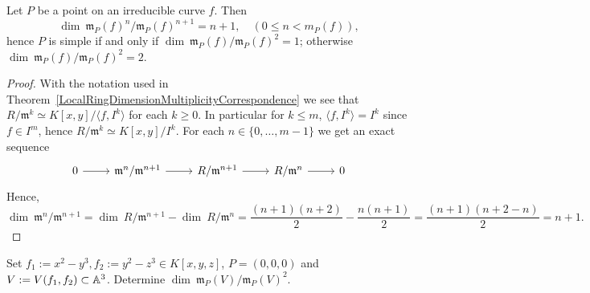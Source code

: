     \begin{proposition}
        Let $P$ be a point on an irreducible curve $f$. Then 
        $$\dim\ \mathfrak{m}_P(f)^n/\mathfrak{m}_P(f)^{n+1} = n+1, \quad (0\leq n < m_P(f)),$$
        hence $P$ is simple if and only if $\dim\ \mathfrak{m}_P(f)/\mathfrak{m}_P(f)^2= 1$; otherwise $\dim\ \mathfrak{m}_P(f)/\mathfrak{m}_P(f)^2= 2$.
    \end{proposition}
    \begin{proof}
        With the notation used in Theorem~\ref{LocalRingDimensionMultiplicityCorrespondence} we see that $R/\mathfrak{m}^k \simeq K[x,y]/\langle f,I^k\rangle$ for each $k\geq 0$. In particular for $k\leq m$, $\langle f, I^k\rangle = I^k$ since $f\in I^m$, hence $R/\mathfrak{m}^k \simeq K[x,y]/I^k$. For each $n\in\{0,\dots,m-1\}$ we get an exact sequence 
        $$\begin{tikzcd}
            0\arrow[r] & \mathfrak{m}^n/\mathfrak{m}^{n+1} \arrow[r] &R/\mathfrak{m}^{n+1} \arrow[r] & R/\mathfrak{m}^n \arrow[r] & 0
        \end{tikzcd}$$
        Hence, $$\dim \ \mathfrak{m}^n/\mathfrak{m}^{n+1} = \dim\ R/\mathfrak{m}^{n+1}-\dim \ R/\mathfrak{m}^n = \frac{(n+1)(n+2)}{2}-\frac{n(n+1)}{2} = \frac{(n+1)(n+2-n)}{2}= n+1.$$
    \end{proof}
    \begin{example}
        Set $f_1 := x^2 -y^3,f_2 := y^2-z^3\in K[x,y,z]$, $P=(0,0,0)$ and $V:=V(f_1,f_2)\subset \mathbb{A}^3$. {\LARGE Determine $\dim \ \mathfrak{m}_P(V)/\mathfrak{m}_P(V)^2$}.
    \end{example}
